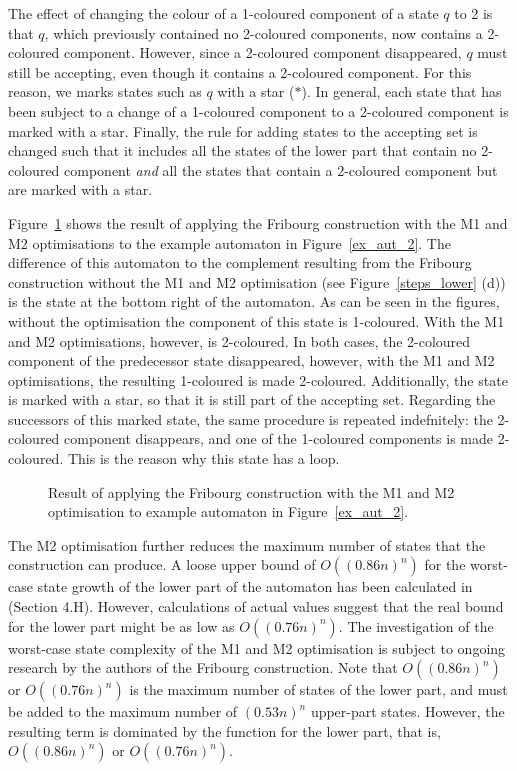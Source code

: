 The effect of changing the colour of a 1-coloured component of a state $q$ to 2 is that $q$, which previously contained no 2-coloured  components, now contains a 2-coloured component. However, since a 2-coloured component disappeared, $q$ must still be accepting, even though it contains a 2-coloured component. For this reason, we marks states such as $q$ with a star ($*$). In general, each state that has been subject to a change of a 1-coloured component to a 2-coloured component is marked with a star. Finally, the rule for adding states to the accepting set is changed such that it includes all the states of the lower part that contain no 2-coloured component \textit{and} all the states that contain a 2-coloured component but are marked with a star.


Figure~\ref{complement_with_m2} shows the result of applying the Fribourg construction with the M1 and M2 optimisations to the example automaton in Figure~\ref{ex_aut_2}. The difference of this automaton to the complement resulting from the Fribourg construction without the M1 and M2 optimisation (see Figure~\ref{steps_lower} (d)) is the state at the bottom right of the automaton. As can be seen in the figures, without the optimisation the component  of this state is 1-coloured. With the M1 and M2 optimisations, however,  is 2-coloured. In both cases, the 2-coloured component of the predecessor state disappeared, however, with the M1 and M2 optimisations, the resulting 1-coloured  is made 2-coloured. Additionally, the state is marked with a star, so that it is still part of the accepting set. Regarding the successors of this marked state, the same procedure is repeated indefnitely: the 2-coloured component disappears, and one of the 1-coloured components is made 2-coloured. This is the reason why this state has a loop.

\begin{figure}[htb]
\centering
\ComplementWithMTwo
\caption{Result of applying the Fribourg construction with the M1 and M2 optimisation to example automaton in Figure~\ref{ex_aut_2}.}
\label{complement_with_m2}
\end{figure}

The M2 optimisation further reduces the maximum number of states that the construction can produce. A loose upper bound of $O((0.86n)^n)$ for the worst-case state growth of the lower part of the automaton has been calculated in \cite{2014_joel_ulrich} (Section 4.H). However, calculations of actual values suggest that the real bound for the lower part might be as low as $O((0.76n)^n)$. The investigation of the worst-case state complexity of the M1 and M2 optimisation is subject to ongoing research by the authors of the Fribourg construction. Note that $O((0.86n)^n)$ or $O((0.76n)^n)$ is the maximum number of states of the lower part, and must be added to the maximum number of $(0.53n)^n$ upper-part states. However, the resulting term is dominated by the function for the lower part, that is, $O((0.86n)^n)$ or $O((0.76n)^n)$.


